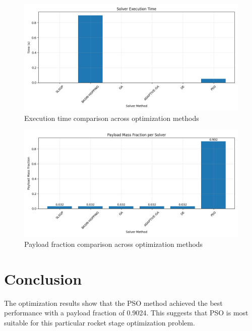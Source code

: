 \documentclass{article}
\begin{document}
\begin{figure}[H]
\centering
\includegraphics[width=\textwidth]{execution_time.png}
\caption{Execution time comparison across optimization methods}
\label{fig:execution-time}
\end{figure}

\begin{figure}[H]
\centering
\includegraphics[width=\textwidth]{payload_fraction.png}
\caption{Payload fraction comparison across optimization methods}
\label{fig:payload-fraction}
\end{figure}

\section{Conclusion}
The optimization results show that the PSO method achieved the best performance with a payload fraction of 0.9024. This suggests that PSO is most suitable for this particular rocket stage optimization problem.
\end{document}
